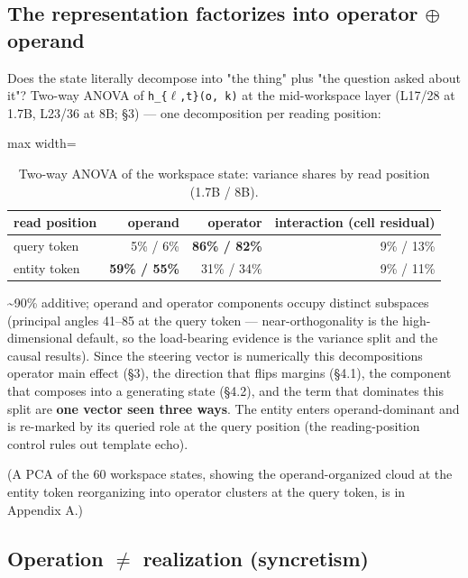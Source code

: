 \subsection{The representation factorizes into operator \ensuremath{\oplus}
operand}

Does the state literally decompose into "the thing" plus "the question
asked about it"? Two-way ANOVA of \texttt{h\_\{\ensuremath{\ell},t\}(o,\ k)} at the
mid-workspace layer (L17/28 at 1.7B, L23/36 at 8B; \S{}3) --- one
decomposition per reading position:

{
\begin{table}[t]
\centering\small
\setlength{\tabcolsep}{4pt}
\begin{adjustbox}{max width=\textwidth}
\begin{tabular}{lrrr}
\toprule
read position & operand & operator & interaction (cell residual) \\
\midrule
query token & 5\% / 6\% & \textbf{86\% / 82\%} & 9\% / 13\% \\
entity token & \textbf{59\% / 55\%} & 31\% / 34\% & 9\% / 11\% \\
\bottomrule
\end{tabular}
\end{adjustbox}
\caption{Two-way ANOVA of the workspace state: variance shares by read position (1.7B / 8B).}
\end{table}
}

\textasciitilde90\% additive; operand and operator components occupy
distinct subspaces (principal angles 41--85\textdegree{} at the query token ---
near-orthogonality is the high-dimensional default, so the load-bearing
evidence is the variance split and the causal results). Since the
steering vector is numerically this decomposition\textquotesingle s
operator main effect (\S{}3), the direction that flips margins (\S{}4.1), the
component that composes into a generating state (\S{}4.2), and the term
that dominates this split are \textbf{one vector seen three ways}. The
entity enters operand-dominant and is re-marked by its queried role at
the query position (the reading-position control rules out template
echo).

(A PCA of the 60 workspace states, showing the operand-organized cloud
at the entity token reorganizing into operator clusters at the query
token, is in Appendix A.)

\subsection{Operation \ensuremath{\neq} realization
(syncretism)}

